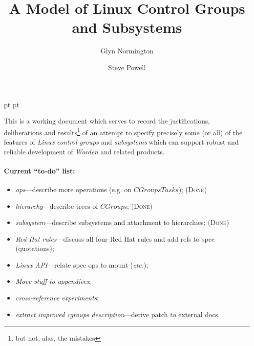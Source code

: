 \documentclass[a4paper,twoside,12pt]{article}
\begin{document}
 pt
 pt

\def\Slash{\slash\hspace{0pt}}

\title{A Model of Linux Control Groups and Subsystems}

\author{
Glyn Normington\and
Steve Powell
}

\maketitle
\thispagestyle{myheadings}
\setcounter{page}{1}


This is a working document which serves to record the justifications, deliberations and results\footnote{but 
not, alas, the mistakes} of an attempt to
specify precisely some (or all) of the features of \emph{Linux control groups} and \emph{subsystems} which can support robust and reliable development of \emph{Warden} and related products.

\paragraph{Current ``to-do'' list:}
\begin{itemize}
\item \emph{ops}---describe more operations (e.g. on $CGroupsTasks$); (\textsc{Done})
\item \emph{hierarchy}---describe trees of $CGroup$s; (\textsc{Done})
\item \emph{subsystem}---describe subsystems and attachment to hierarchies; (\textsc{Done})
\item \emph{Red Hat rules}---discuss all four Red Hat rules and add refs to spec (quotations);
\item \emph{Linux API}---relate spec ops to mount (\emph{etc.});
\item \emph{Move stuff to appendices};
\item \emph{cross-reference experiments};
\item \emph{extract improved cgroups description}---derive patch to external docs.
\end{itemize}

\end{document}
